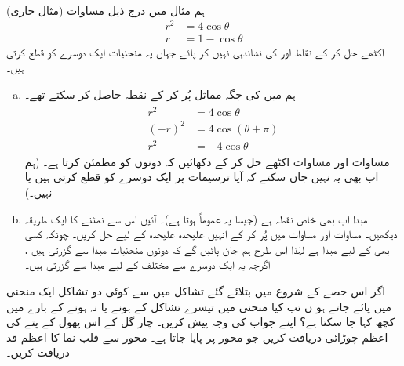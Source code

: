 \\
 (مثال  جاری)
ہم مثال  میں درج ذیل مساوات
\begin{align}
r^2&=4\cos\theta\label{مساوات_سوال_مخروط_معلوم_نہیں_الف}\\
r&=1-\cos\theta\label{مساوات_سوال_مخروط_معلوم_نہیں_ب}
\end{align}
اکٹھے حل کر کے  نقاط  اور  کی نشاندہی نہیں کر پائے جہاں یہ منحنیات ایک دوسرے کو قطع کرتی ہیں۔
\begin{enumerate}[a.]
\item
ہم  میں  کی جگہ مماثل  پُر کر کے نقطہ  حاصل کر سکتے تھے۔
\begin{gather}
\begin{aligned}\label{مساوات_سوال_مخروط_معلوم_نہیں_پ}
r^2&=4\cos\theta\\
(-r)^2&=4\cos(\theta+\pi)\\
r^2&=-4\cos\theta
\end{aligned}
\end{gather}
مساوات  اور مساوات  اکٹھے حل کر کے دکھائیں کہ  دونوں کو مطمئن کرتا ہے۔ (ہم اب بھی یہ نہیں جان سکتے  کہ آیا  ترسیمات  پر ایک دوسرے کو قطع کرتی ہیں یا نہیں۔)
\item
مبدا اب بھی خاص نقطہ ہے (جیسا یہ عموماً ہوتا ہے)۔ آئیں اس سے نمٹنے کا ایک طریقہ دیکھیں۔ مساوات  اور مساوات  میں  پُر کر کے انہیں علیحدہ علیحدہ  کے لیے حل کریں۔ چونکہ کسی بھی  کے لیے  مبدا ہے لہٰذا اس طرح ہم جان پائیں گے کہ دونوں منحنیات مبدا سے گزرتی ہیں ، اگرچہ یہ ایک دوسرے سے مختلف  کے لیے مبدا سے گزرتی ہیں۔
\end{enumerate}
اگر اس حصے  کے شروع میں بتلائے گئے  تشاکل میں سے کوئی دو تشاکل ایک منحنی میں پائے جاتے ہو ں تب کیا منحنی میں   تیسرے تشاکل  کے ہونے یا نہ ہونے کے بارے میں کچھ کہا جا سکتا ہے؟  اپنے جواب کی وجہ پیش کریں۔
چار گل  کے اس پھول کے پتے کی اعظم چوڑائی دریافت کریں جو محور  پر پایا جاتا ہے۔
محور  سے قلب نما  کا اعظم  قد دریافت کریں۔

